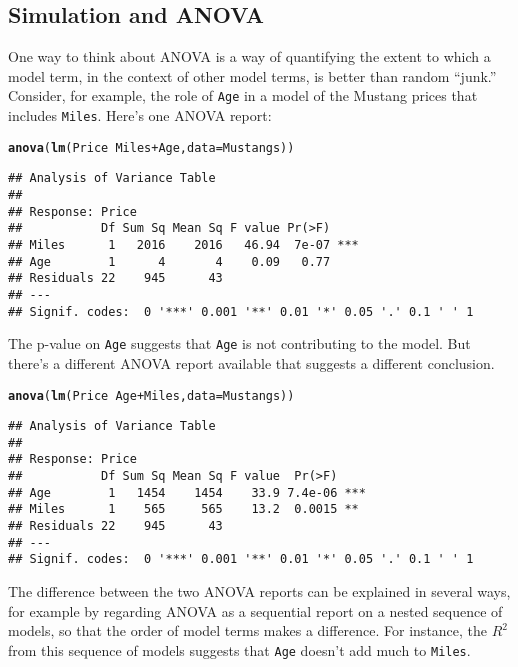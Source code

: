 \documentclass[11pt]{article}\usepackage[]{graphicx}\usepackage[]{color}
\makeatletter
\newcommand{\hlopt}[1]{\textcolor[rgb]{0,0,0}{#1}}%
\newcommand{\hlstd}[1]{\textcolor[rgb]{0.345,0.345,0.345}{#1}}%
\newcommand{\hlkwc}[1]{\textcolor[rgb]{0.333,0.667,0.333}{#1}}%
\newcommand{\hlkwd}[1]{\textcolor[rgb]{0.737,0.353,0.396}{\textbf{#1}}}%
\newenvironment{kframe}{%
 \def\at@end@of@kframe{}%
 \ifinner\ifhmode%
  \def\at@end@of@kframe{\end{minipage}}%
  \begin{minipage}{\columnwidth}%
 \fi\fi%
 \def\FrameCommand##1{\hskip\@totalleftmargin \hskip-\fboxsep
 \colorbox{shadecolor}{##1}\hskip-\fboxsep
     \hskip-\linewidth \hskip-\@totalleftmargin \hskip\columnwidth}%
 \MakeFramed {\advance\hsize-\width
   \@totalleftmargin\z@ \linewidth\hsize
   \@setminipage}}%
 {\par\unskip\endMakeFramed%
 \at@end@of@kframe}
\newenvironment{knitrout}{}{} %
\makeatother
\begin{document}
\subsection{Simulation and {\sc ANOVA}}

One way to think about {\sc ANOVA} is a way of quantifying the extent to which a model term, in the context of other model terms, is better than random ``junk.'' Consider, for example, the role of \texttt{Age} in a model of the Mustang prices that includes \texttt{Miles}.  Here's one {\sc ANOVA} report:
\begin{knitrout}
\color{fgcolor}\begin{kframe}
\begin{alltt}
\hlkwd{anova}\hlstd{(}\hlkwd{lm}\hlstd{(Price} \hlopt{~} \hlstd{Miles} \hlopt{+} \hlstd{Age,} \hlkwc{data} \hlstd{= Mustangs))}
\end{alltt}
\begin{verbatim}
## Analysis of Variance Table
## 
## Response: Price
##           Df Sum Sq Mean Sq F value Pr(>F)    
## Miles      1   2016    2016   46.94  7e-07 ***
## Age        1      4       4    0.09   0.77    
## Residuals 22    945      43                   
## ---
## Signif. codes:  0 '***' 0.001 '**' 0.01 '*' 0.05 '.' 0.1 ' ' 1
\end{verbatim}
\end{kframe}
\end{knitrout}
The p-value on \texttt{Age} suggests that \texttt{Age} is not contributing to the model.  But there's a different {\sc ANOVA} report available that suggests a different conclusion.
\begin{knitrout}
\color{fgcolor}\begin{kframe}
\begin{alltt}
\hlkwd{anova}\hlstd{(}\hlkwd{lm}\hlstd{(Price} \hlopt{~} \hlstd{Age} \hlopt{+} \hlstd{Miles,} \hlkwc{data} \hlstd{= Mustangs))}
\end{alltt}
\begin{verbatim}
## Analysis of Variance Table
## 
## Response: Price
##           Df Sum Sq Mean Sq F value  Pr(>F)    
## Age        1   1454    1454    33.9 7.4e-06 ***
## Miles      1    565     565    13.2  0.0015 ** 
## Residuals 22    945      43                    
## ---
## Signif. codes:  0 '***' 0.001 '**' 0.01 '*' 0.05 '.' 0.1 ' ' 1
\end{verbatim}
\end{kframe}
\end{knitrout}
The difference between the two {\sc ANOVA} reports can be explained in 
several ways, for example by regarding {\sc ANOVA} as a sequential report 
on a nested sequence of models, so that the order of model terms makes 
a difference.  For instance, the $R^2$ from this sequence of models suggests 
that \texttt{Age} doesn't add much to \texttt{Miles}.
\end{document}
